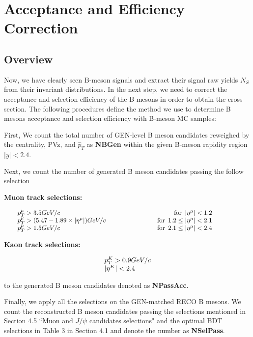 \section{Acceptance and Efficiency Correction} 

\subsection{Overview}

Now, we have clearly seen B-meson signals and extract their signal raw yields $N_S$ from their invariant distributions. In the next step, we need to correct the acceptance and selection efficiency of the B mesons in order to obtain the cross section. The following procedures define the method we use to determine B mesons acceptance and selection efficiency with B-meson MC samples:

First, We count the total number of GEN-level B meson candidates reweighed by the centrality, PVz, and $\hat p_T$ as \textbf{NBGen} within the given B-meson rapidity region $|y| < 2.4$.

Next, we count the number of generated B meson candidates passing the follow selection 

\textbf{Muon track selections:}

\begin{equation}
\centering
\setlength\arraycolsep{20pt}
\begin{array}{l c r r}
p_T^{\mu}>3.5 GeV/c & & \text{for}\enspace |\eta^{\mu}|<1.2 & \\
p_T^{\mu}>(5.47 - 1.89\times |\eta^{\mu}|) GeV/c & &  \text{for}\enspace 1.2\le |\eta^{\mu}|<2.1 &\\
p_T^{\mu}>1.5 GeV/c & & \text{for}\enspace 2.1\le |\eta^{\mu}|<2.4 &
\end{array}
\label{eq:SingleMuonAccCuts}
\end{equation}


\textbf{Kaon track selections:}

\begin{equation}
\centering
\setlength\arraycolsep{20pt}
\begin{array}{l c r r}
p_T^{K}>0.9 GeV/c \\
|\eta^{K}| < 2.4
\end{array}
\label{eq:KaonTrackCut}
\end{equation}

to the generated B meson candidates denoted as \textbf{NPassAcc}.


Finally, we apply all the selections on the GEN-matched RECO B mesons. We count the reconstructed B meson candidates passing the selections mentioned in Section 4.5 ``Muon and $J/\psi$ candidates selections" and the optimal BDT selections in Table 3 in Section 4.1 and denote the number as \textbf{NSelPass}.


